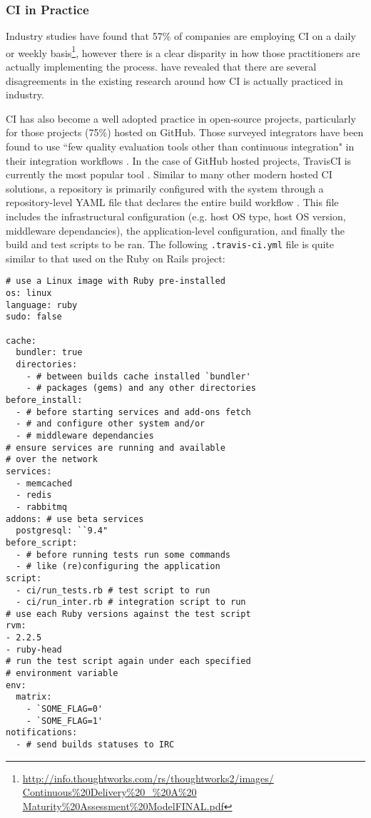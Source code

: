 \documentclass{report}
\begin{document}
\subsubsection{CI in Practice}
Industry studies have found that 57\% of companies are employing
CI on a daily or weekly basis\footnote{\href{http://info.thoughtworks.com/rs/thoughtworks2/images/Continuous\%20Delivery\%20_\%20A\%20Maturity\%20Assessment\%20ModelFINAL.pdf}{http://info.thoughtworks.com/rs/thoughtworks2/images/\\Continuous\%20Delivery\%20_\%20A\%20\\Maturity\%20Assessment\%20ModelFINAL.pdf}}, however there is a clear disparity in how those
practitioners are actually implementing the process. \citet{Stahl} have revealed that there are several disagreements in the existing research around how CI is actually practiced in industry. 
\par
CI has also become a well adopted practice in open-source projects,
particularly for those projects (75\%) hosted on GitHub. Those surveyed 
integrators have been found to use ``few quality evaluation tools other than
continuous integration" in their integration workflows \citep{Gous}. 
In the case of GitHub hosted projects, 
TravisCI is currently the most popular tool \citep{Yu}. Similar to many other
modern hosted CI solutions, a repository is primarily configured 
with the system through a repository-level YAML file that declares the entire build workflow  \citep{Santos}.
This file includes the infrastructural configuration (e.g. host OS type, host OS version, middleware dependancies), the application-level configuration, and finally the build and test scripts to be ran. The following \texttt{.travis-ci.yml} file is quite
similar to that used on the Ruby on Rails project:
\begin{verbatim}
# use a Linux image with Ruby pre-installed
os: linux 
language: ruby
sudo: false

cache:
  bundler: true
  directories:
    - # between builds cache installed `bundler' 
    - # packages (gems) and any other directories
before_install:
  - # before starting services and add-ons fetch
  - # and configure other system and/or 
  - # middleware dependancies
# ensure services are running and available 
# over the network
services:
  - memcached
  - redis
  - rabbitmq
addons: # use beta services
  postgresql: ``9.4"
before_script:
  - # before running tests run some commands 
  - # like (re)configuring the application
script: 
  - ci/run_tests.rb # test script to run
  - ci/run_inter.rb # integration script to run
# use each Ruby versions against the test script
rvm:
- 2.2.5
- ruby-head
# run the test script again under each specified 
# environment variable 
env:
  matrix:
    - `SOME_FLAG=0'
    - `SOME_FLAG=1'
notifications:
  - # send builds statuses to IRC
  \end{verbatim}
\end{document}
